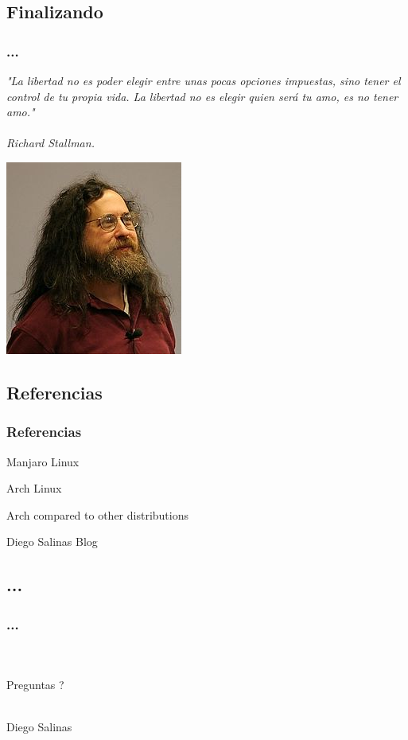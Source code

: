 \documentclass[9pt,t]{beamer}
\begin{document}
\subsection{Finalizando}
\begin{frame}
  \frametitle{...}
	  \begin{flushright}
	    {\it "La libertad no es poder elegir entre unas pocas opciones impuestas, sino tener el control de tu propia vida. 
		La libertad no es elegir quien será tu amo, es no tener amo." \ \\ \ \\
		Richard Stallman.}\ \\
		\begin{center}
		  \includegraphics[height=0.27\textheight]{images/13_stallman.jpg} \hspace*{0.0cm}
		\end{center}
	  \end{flushright}
\end{frame}

\subsection{Referencias}
\begin{frame}
  \frametitle{Referencias}
    \begin{thebibliography}{10}

    \beamertemplatearticlebibitems

      Manjaro Linux

      Arch Linux

      Arch compared to other distributions

      Diego Salinas Blog

    \end{thebibliography}
\end{frame}

\subsection{...}
\begin{frame}
  \frametitle{...}
  \ \\ \ \\
  \huge Preguntas ?

  \begin{flushright}
    \ \\
    \huge Diego Salinas

  \end{flushright}
\end{frame}
\end{document}
